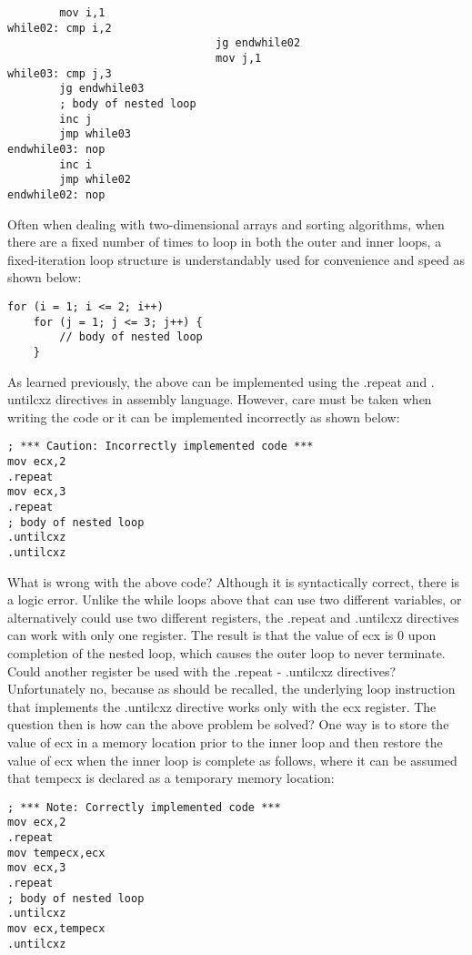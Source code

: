 \documentclass[10pt]{article}
\begin{document}
\begin{verbatim}
        mov i,1
while02: cmp i,2
                                jg endwhile02
                                mov j,1
while03: cmp j,3
        jg endwhile03
        ; body of nested loop
        inc j
        jmp while03
endwhile03: nop
        inc i
        jmp while02
endwhile02: nop
\end{verbatim}

Often when dealing with two-dimensional arrays and sorting algorithms, when there are a fixed number of times to loop in both the outer and inner loops, a fixed-iteration loop structure is understandably used for convenience and speed as shown below:

\begin{verbatim}
for (i = 1; i <= 2; i++)
    for (j = 1; j <= 3; j++) {
        // body of nested loop
    }
\end{verbatim}

As learned previously, the above can be implemented using the .repeat and . untilcxz directives in assembly language. However, care must be taken when writing the code or it can be implemented incorrectly as shown below:

\begin{verbatim}
; *** Caution: Incorrectly implemented code ***
mov ecx,2
.repeat
mov ecx,3
.repeat
; body of nested loop
.untilcxz
.untilcxz
\end{verbatim}

What is wrong with the above code? Although it is syntactically correct, there is a logic error. Unlike the while loops above that can use two different variables, or alternatively could use two different registers, the .repeat and .untilcxz directives can work with only one register. The result is that the value of ecx is 0 upon completion of the nested loop, which causes the outer loop to never terminate. Could another register be used with the .repeat - .untilcxz directives? Unfortunately no, because as should be recalled, the underlying loop instruction that implements the .untilcxz directive works only with the ecx register. The question then is how can the above problem be solved? One way is to store the\\
value of ecx in a memory location prior to the inner loop and then restore the value of ecx when the inner loop is complete as follows, where it can be assumed that tempecx is declared as a temporary memory location:

\begin{verbatim}
; *** Note: Correctly implemented code ***
mov ecx,2
.repeat
mov tempecx,ecx
mov ecx,3
.repeat
; body of nested loop
.untilcxz
mov ecx,tempecx
.untilcxz
\end{verbatim}
\end{document}
